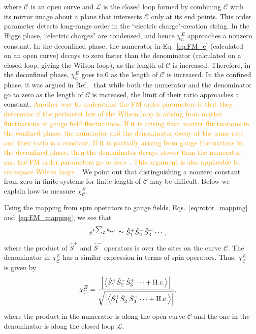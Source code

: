 \documentclass[twocolumn,superscriptaddress,amsmath,amssymb,aps,prx,nofootinbib]{revtex4-2}
\newcommand{\addtext}[1]{\textcolor{orange}{#1}}
\begin{document}
where $\mathcal{C}$ is an open curve and $\mathcal{L}$ is the closed loop formed by combining $\mathcal{C}$ with its mirror image about a plane that intersects $\mathcal{C}$ only at its end points. This order parameter detects long-range order in the ``electric charge"-creation string. In the Higgs phase, ``electric charges" are condensed, and hence $\chi_{\mathcal{C}}^E$ approaches a nonzero constant. In the deconfined phase, the numerator in Eq.~\eqref{eq:FM_e} (calculated on an open curve) decays to zero faster than the denominator (calculated on a closed loop, giving the Wilson loop), as the length of $\mathcal{C}$ is increased. Therefore, in the deconfined phase, $\chi_{\mathcal{C}}^E$ goes to 0 as the length of $\mathcal{C}$ is increased. In the confined phase, it was argued in Ref.~\cite{fredenhagen1986} that while both the numerator and the denominator go to zero as the length of $\mathcal{C}$ is increased, the limit of their ratio approaches a constant.
\addtext{Another way to understand the FM order parameters is that they determine if the perimeter law of the Wilson loop is arising from matter fluctuations or gauge  field fluctuations. If it is arising from matter fluctuations in the confined phase, the numerator and the denominator decay at the same rate and their ratio is a constant. If it is partially arising  from gauge fluctuations in the deconfined phase, then the denominator decays slower than the numerator and the FM order parameters go to zero~\cite{fredenhagen1983charged}. This argument is also applicable to real-space Wilson loops~\cite{fredenhagen1988dual,gregor2011diagnosing,xu2024critical,verresen2021}.}
We point out that distinguishing a nonzero constant from zero in finite systems for finite length of $\mathcal{C}$ may be difficult.
Below we explain how to measure $\chi_{\mathcal{C}}^E$. 

Using the mapping from spin operators to gauge fields, Eqs.~\eqref{eq:rotor_mapping} and~\eqref{eq:EM_mapping}, we see that
\begin{equation} 
   e^{i\sum_\mathcal{C} \hat{a}_{\vb{r} \vb{r}'}} \simeq \hat{S}_1^+\hat{S}_2^-\hat{S}_3^+\cdots,
\end{equation}
where the product of $\hat{S}^+$ and $ \hat{S}^-$ operators is over the sites on the curve $\mathcal{C}$.
The denominator in $\chi_{\mathcal{C}}^E$ has a similar expression in terms of spin operators. Thus, $\chi_{\mathcal{C}}^{E}$ is given by
\begin{equation}\label{eq:FM_e_plus_minus}
      \chi_{\mathcal{C}}^E = \frac{\abs{ \expval{ \hat{S}_1^+\hat{S}_2^-\hat{S}_3^+\cdots +\text{H.c.} } } }{\sqrt{ \abs{ \expval{ \hat{S}_1^+\hat{S}_2^-\hat{S}_3^+\cdots + \text{H.c.} }  }}},
\end{equation}
where the product in the numerator is along the open curve $\mathcal{C}$ and the one in the denominator is along the closed loop $\mathcal{L}$.
\end{document}
